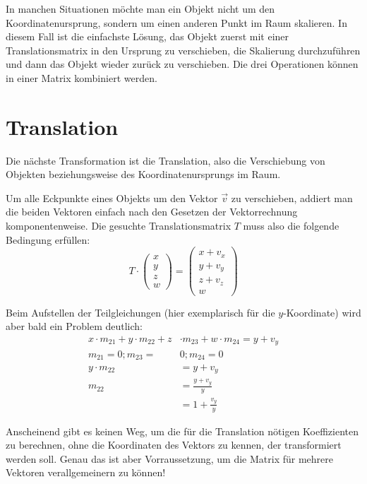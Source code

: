 In manchen Situationen möchte man ein Objekt nicht um den Koordinatenursprung, sondern um einen anderen Punkt im Raum skalieren. In diesem Fall ist die einfachste Lösung, das Objekt zuerst mit einer Translationsmatrix in den Ursprung zu verschieben, die Skalierung durchzuführen und dann das Objekt wieder zurück zu verschieben. Die drei Operationen können in einer Matrix kombiniert werden.


\section{Translation}
Die nächste Transformation ist die Translation, also die Verschiebung von Objekten beziehungsweise des Koordinatenursprungs im Raum.

Um alle Eckpunkte eines Objekts um den Vektor $\vec v$ zu verschieben, addiert man die beiden Vektoren einfach nach den Gesetzen der Vektorrechnung komponentenweise. Die gesuchte Translationsmatrix $T$ muss also die folgende Bedingung erfüllen:
\begin{equation}
 T \cdot 
 \begin{pmatrix}
  x \\
  y \\
  z \\
  w
 \end{pmatrix}
 =
 \begin{pmatrix}
  x + v_x \\
  y + v_y \\
  z + v_z \\
  w
 \end{pmatrix}
\end{equation}

Beim Aufstellen der Teilgleichungen (hier exemplarisch für die $y$-Koordinate) wird aber bald ein Problem deutlich:
\begin{equation}
\begin{split}
 x \cdot m_{21} + y \cdot m_{22} + z & \cdot m_{23} + w \cdot m_{24} = y + v_y \\
 m_{21} = 0; m_{23} = & 0; m_{24} = 0 \\
 y \cdot m_{22} & = y + v_y \\
 m_{22} & = \frac{y + v_y}{y} \\
 & = 1 + \frac{v_y}{y}
\end{split}
\end{equation}

Anscheinend gibt es keinen Weg, um die für die Translation nötigen Koeffizienten zu berechnen, ohne die Koordinaten des Vektors zu kennen, der transformiert werden soll. Genau das ist aber Vorraussetzung, um die Matrix für mehrere Vektoren verallgemeinern zu können!


